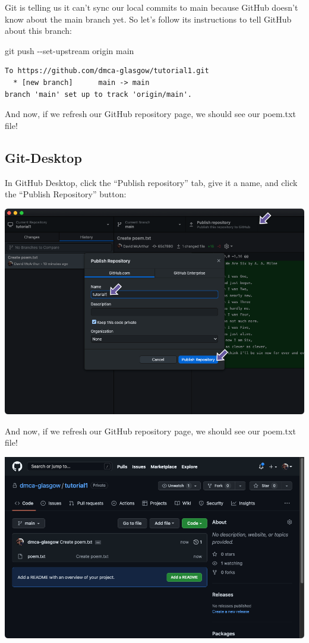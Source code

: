 \documentclass[
  letterpaper,
  DIV=11,
  numbers=noendperiod]{scrartcl}
\newenvironment{Shaded}{\begin{snugshade}}{\end{snugshade}}
\newcommand{\NormalTok}[1]{\textcolor[rgb]{0.00,0.23,0.31}{#1}}
\newcommand{\SpecialCharTok}[1]{\textcolor[rgb]{0.37,0.37,0.37}{#1}}
\begin{document}
Git is telling us it can't sync our local commits to main because GitHub
doesn't know about the main branch yet. So let's follow its instructions
to tell GitHub about this branch:

\begin{Shaded}
\begin{Highlighting}[]
\NormalTok{git push }\SpecialCharTok{{-}{-}}\NormalTok{set}\SpecialCharTok{{-}}\NormalTok{upstream origin main}
\end{Highlighting}
\end{Shaded}

\begin{verbatim}
To https://github.com/dmca-glasgow/tutorial1.git
  * [new branch]      main -> main
branch 'main' set up to track 'origin/main'.
\end{verbatim}

And now, if we refresh our GitHub repository page, we should see our
poem.txt file!

\subsection{Git-Desktop}

In GitHub Desktop, click the ``Publish repository'' tab, give it a name,
and click the ``Publish Repository'' button:

\includegraphics{images/image15.png}

And now, if we refresh our GitHub repository page, we should see our
poem.txt file!

\includegraphics{images/image16.png}
\end{document}
